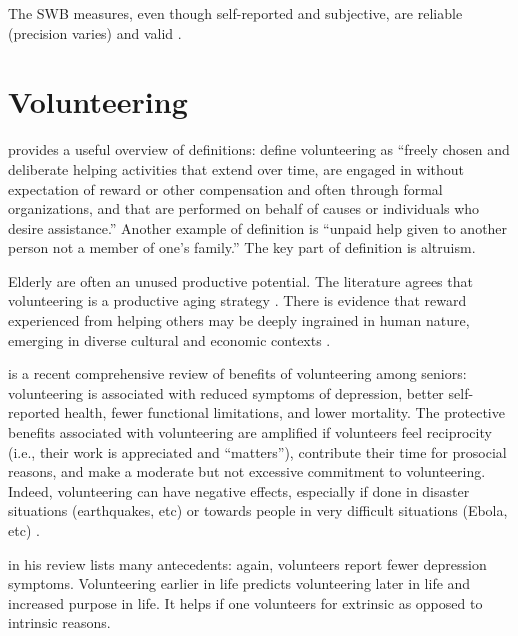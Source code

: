 \documentclass[10pt, letterpaper]{article}
\begin{document}
\begin{spacing}{1.4}
The SWB measures, even though self-reported and
 subjective, are  reliable (precision varies) %
 and valid \citep{myers00,ditella06m,diener09}. 


\section{Volunteering}

\citet[][p.177]{wilson12B} provides a useful overview of definitions: 
 define volunteering as
 ``freely chosen and deliberate helping activities that
extend over time, are engaged in without expectation of reward or other
compensation
and often through formal organizations, and that are performed on behalf of
causes or individuals who desire assistance.'' Another example of definition is ``unpaid help given
to another person not a member of one's family.'' The key part of definition is altruism.

Elderly are often an unused productive potential.
The literature agrees that volunteering is a productive aging strategy
\citep[e.g.,][]{wilson12B,hank09}. 
There is evidence that reward experienced from helping others may be deeply
ingrained in human nature, emerging in diverse cultural and economic contexts \citep{aknin13}.

\citet{anderson14} is a recent comprehensive review of benefits of
volunteering among seniors: volunteering is associated with reduced symptoms of
depression, better self-reported health, fewer functional limitations, and lower
mortality. The protective benefits associated with volunteering are amplified if
volunteers feel reciprocity (i.e., their work is appreciated and ``matters''), contribute their
time for prosocial reasons, and make a moderate but not excessive commitment to
volunteering. Indeed, volunteering can have negative effects, especially if done
in disaster situations (earthquakes, etc) or towards people in very difficult
situations (Ebola, etc) \citep{wilson12B}.

\citet{wilson12B} in his review lists many antecedents: again, volunteers report fewer depression symptoms. Volunteering
earlier in life predicts volunteering later in life and increased purpose in
life. It helps if one volunteers for extrinsic as opposed to intrinsic reasons. 



\end{spacing}
\end{document}
